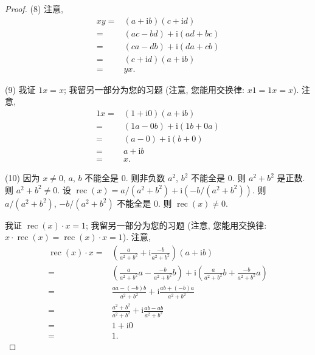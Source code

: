 \documentclass[../libro.tex]{subfiles}
\begin{document}
\begin{proof}
    (8)
    注意,
    \begin{align*}
        x y
        = {} &
        (a + \mathrm{i} b) (c + \mathrm{i} d)
        \\
        = {} &
        (a c - b d) + \mathrm{i} (a d + b c)
        \\
        = {} &
        (c a - d b) + \mathrm{i} (d a + c b)
        \\
        = {} &
        (c + \mathrm{i} d) (a + \mathrm{i} b)
        \\
        = {} &
        y x.
    \end{align*}

    (9)
    我证 \(1 x = x\);
    我留另一部分为您的习题
    (注意, 您能用交换律:
    \(x 1 = 1 x = x\)).
    注意,
    \begin{align*}
        1 x
        = {} &
        (1 + \mathrm{i} 0) (a + \mathrm{i} b)
        \\
        = {} &
        (1 a - 0 b) + \mathrm{i} (1 b + 0 a)
        \\
        = {} &
        (a - 0) + \mathrm{i} (b + 0)
        \\
        = {} &
        a + \mathrm{i} b
        \\
        = {} &
        x.
    \end{align*}

    (10)
    因为 \(x \neq 0\),
    \(a\), \(b\) 不能全是 \(0\).
    则非负数 \(a^2\), \(b^2\) 不能全是 \(0\).
    则 \(a^2 + b^2\) 是正数.
    则 \(a^2 + b^2 \neq 0\).
    设 \(\operatorname{rec} {(x)}
    = a/(a^2 + b^2) + \mathrm{i} (-b/(a^2 + b^2))\).
    则 \(a/(a^2 + b^2)\), \(-b/(a^2 + b^2)\)
    不能全是 \(0\).
    则 \(\operatorname{rec} {(x)} \neq 0\).

    我证 \(\operatorname{rec} {(x)} \cdot x = 1\);
    我留另一部分为您的习题
    (注意, 您能用交换律: \(
            x \cdot \operatorname{rec} {(x)}
            = \operatorname{rec} {(x)} \cdot x = 1
    \)).
    注意,
    \begin{align*}
        \operatorname{rec} {(x)} \cdot x
        = {} &
        \left( \frac{a}{a^2 + b^2}
        + \mathrm{i} \frac{-b}{a^2 + b^2} \right)
        (a + \mathrm{i} b)
        \\
        = {} &
        \left(
            \frac{a}{a^2 + b^2} a - \frac{-b}{a^2 + b^2} b
        \right)
        + \mathrm{i}
        \left(
            \frac{a}{a^2 + b^2} b + \frac{-b}{a^2 + b^2} a
        \right)
        \\
        = {} &
        \frac{a a - (-b) b}{a^2 + b^2}
        + \mathrm{i} \frac{a b + (-b) a}{a^2 + b^2}
        \\
        = {} &
        \frac{a^2 + b^2}{a^2 + b^2}
        + \mathrm{i} \frac{a b - a b}{a^2 + b^2}
        \\
        = {} &
        1 + \mathrm{i} 0
        \\
        = {} &
        1.
    \end{align*}


\end{proof}
\end{document}
